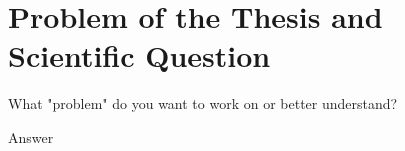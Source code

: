\section{Problem of the Thesis and Scientific Question}
What "problem" do you want to work on or better understand?

Answer